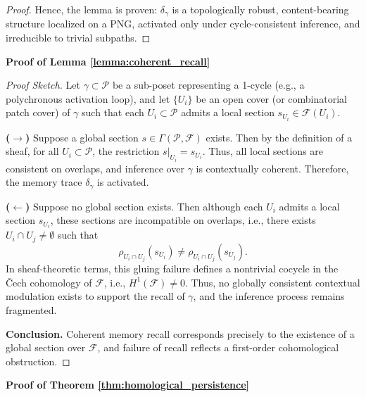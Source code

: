 \documentclass[lettersize,journal]{IEEEtran}
\begin{document}
\begin{proof}
Hence, the lemma is proven: \( \delta_\gamma \) is a topologically robust, content-bearing structure localized on a PNG, activated only under cycle-consistent inference, and irreducible to trivial subpaths.
\end{proof}


\noindent\textbf{Proof of Lemma \ref{lemma:coherent_recall}}

\begin{proof}[Proof Sketch]
Let \( \gamma \subset \mathcal{P} \) be a sub-poset representing a 1-cycle (e.g., a polychronous activation loop), and let \( \{ U_i \} \) be an open cover (or combinatorial patch cover) of \( \gamma \) such that each \( U_i \subset \mathcal{P} \) admits a local section \( s_{U_i} \in \mathcal{F}(U_i) \).

\textbf{($\rightarrow$)} Suppose a global section \( s \in \Gamma(\mathcal{P}, \mathcal{F}) \) exists. Then by the definition of a sheaf, for all \( U_i \subset \mathcal{P} \), the restriction \( s|_{U_i} = s_{U_i} \). Thus, all local sections are consistent on overlaps, and inference over \( \gamma \) is contextually coherent. Therefore, the memory trace \( \delta_\gamma \) is activated.

\textbf{($\leftarrow$)} Suppose no global section exists. Then although each \( U_i \) admits a local section \( s_{U_i} \), these sections are incompatible on overlaps, i.e., there exists \( U_i \cap U_j \ne \emptyset \) such that
\[
\rho_{U_i \cap U_j}(s_{U_i}) \ne \rho_{U_i \cap U_j}(s_{U_j}).
\]
In sheaf-theoretic terms, this gluing failure defines a nontrivial cocycle in the Čech cohomology of \( \mathcal{F} \), i.e., \( H^1(\mathcal{F}) \ne 0 \). Thus, no globally consistent contextual modulation exists to support the recall of \( \gamma \), and the inference process remains fragmented.

\textbf{Conclusion.} Coherent memory recall corresponds precisely to the existence of a global section over \( \mathcal{F} \), and failure of recall reflects a first-order cohomological obstruction.
\end{proof}

\noindent\textbf{Proof of Theorem \ref{thm:homological_persistence}}
\end{document}
